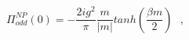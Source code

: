 \begin{equation}
\Pi_{odd}^{NP}(0) =
-\frac {2ig^2}{\pi}\frac {m}{|m|}
tanh(\frac {\beta m}{2}) ~~~,
\end{equation}

